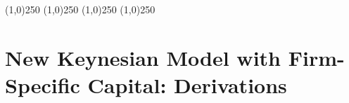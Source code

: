 \documentclass[12pt,notitlepage,oneside]{book}
\begin{document}
\begin{center}
\vspace*{0.15in}
\line(1,0){250}
\vspace*{0.15in}
\line(1,0){250}
\vspace*{0.15in}
\line(1,0){250}
\vspace*{0.15in}
\line(1,0){250}
\end{center}

\newpage


\tableofcontents
\listoftables
\listoffigures
\newpage




\appendix
\chapter{New Keynesian Model with Firm-Specific Capital: Derivations}

\end{document}
